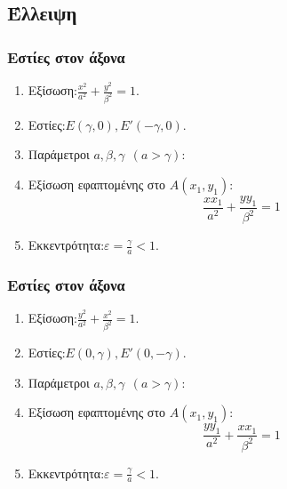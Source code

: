 \documentclass[11pt,a4paper]{article}
\begin{document}
\subsection{Έλλειψη}
\begin{multicols}{2}
\subsubsection{Εστίες στον άξονα }
\begin{enumerate}
\item Εξίσωση:\quad $ \frac{x^2}{a^2}+\frac{y^2}{\beta^2}=1 $.
\item Εστίες:\quad $ E\left(\gamma,0 \right), E'(-\gamma,0) $.
\item Παράμετροι $ a,\beta,\gamma\ \ (a>\gamma) $:
\item Εξίσωση εφαπτομένης στο $ A(x_1,y_1) $: \[  \frac{xx_1}{a^2}+\frac{yy_1}{\beta^2}=1  \]
\item Εκκεντρότητα:\quad $ \varepsilon=\frac{\gamma}{a}<1 $.
\end{enumerate}
\subsubsection{Εστίες στον άξονα }
\begin{enumerate}
\item Εξίσωση:\quad $ \frac{y^2}{a^2}+\frac{x^2}{\beta^2}=1 $.
\item Εστίες:\quad $ E\left(0,\gamma\right), E'(0,-\gamma) $.
\item Παράμετροι $ a,\beta,\gamma\ \ (a>\gamma) $:
\item Εξίσωση εφαπτομένης στο $ A(x_1,y_1) $: \[  \frac{yy_1}{a^2}+\frac{xx_1}{\beta^2}=1  \]
\item Εκκεντρότητα:\quad $ \varepsilon=\frac{\gamma}{a}<1 $.
\end{enumerate}
\end{multicols}
\newpage
\noindent
\end{document}
